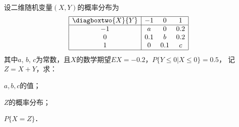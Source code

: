 \documentclass[plain,noanswer,medmath]{../../template/jnuexam}
\begin{document}


















\begin{problem}[points=13]
设二维随机变量$(X,Y)$的概率分布为
$$\begin{array}{|c|ccc|}
\hline
  \diagboxtwo{X}{Y} &  -1 &   0 & 1 \\
\hline
             -1 &   a &   0 & 0.2 \\
              0 & 0.1 &   b & 0.2 \\
              1 &   0 & 0.1 & c \\
\hline
\end{array}$$
其中$a$, $b$, $c$为常数，且$X$的数学期望$EX = - 0.2$，$P\{Y \le 0|X \le 0\} = 0.5$，
记$Z = X + Y$，求：\par
\begin{enumerate*}
\item $a,b,c$的值；
\item $Z$的概率分布；
\item $P\{X = Z\}$．
\end{enumerate*}
\end{problem}


\end{document}
